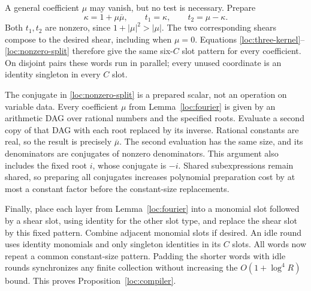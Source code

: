 A general coefficient $\mu$ may vanish, but no test is necessary.
Prepare
\begin{equation}\label{loc:nonzero-split}
 \kappa=1+\mu\overline\mu,\qquad
 t_1=\kappa,\qquad t_2=\mu-\kappa.
\end{equation}
Both $t_1,t_2$ are nonzero, since
$1+|\mu|^2>|\mu|$.  The two corresponding shears compose to the
desired shear, including when $\mu=0$.  Equations
\eqref{loc:three-kernel}--\eqref{loc:nonzero-split} therefore give the
same six-$C$ slot pattern for every coefficient.  On disjoint pairs
these words run in parallel; every unused coordinate is an identity
singleton in every $C$ slot.

The conjugate in \eqref{loc:nonzero-split} is a prepared scalar, not
an operation on variable data.  Every coefficient $\mu$ from
Lemma~\ref{loc:fourier} is given by an arithmetic DAG over rational
numbers and the specified roots.  Evaluate a second copy of that DAG
with each root replaced by its inverse.  Rational constants are real,
so the result is precisely $\overline\mu$.  The second evaluation has
the same size, and its denominators are conjugates of nonzero
denominators.  This argument also includes the fixed root $i$, whose
conjugate is $-i$.  Shared subexpressions remain shared, so preparing
all conjugates increases polynomial preparation cost by at most a
constant factor before the constant-size replacements.

Finally, place each layer from Lemma~\ref{loc:fourier} into a
monomial slot followed by a shear slot, using identity for the other
slot type, and replace the shear slot by this fixed pattern.  Combine adjacent monomial slots if desired.  An idle round
uses identity monomials and only singleton identities in its $C$
slots.  All words now repeat a common constant-size pattern.  Padding
the shorter words with idle rounds synchronizes any finite collection
without increasing the $O(1+\log^4R)$ bound.  This proves
Proposition~\ref{loc:compiler}.
